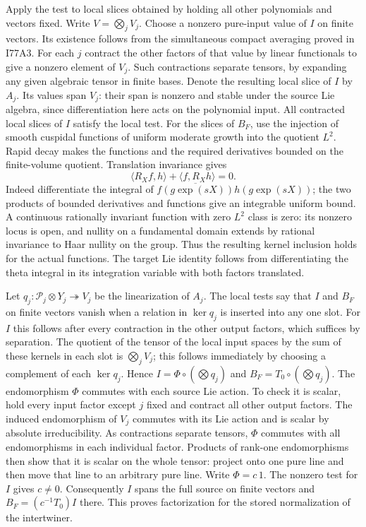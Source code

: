 Apply the test to local slices obtained by holding all other
polynomials and vectors fixed. Write $V=\bigotimes_j V_j$.
Choose a nonzero pure-input value of $I$ on finite vectors. Its
existence follows from the simultaneous compact averaging proved
in I77A3. For each $j$ contract the other factors of that
value by linear functionals to give a nonzero element of $V_j$.
Such contractions separate tensors, by expanding any given algebraic
tensor in finite bases. Denote the resulting local slice of $I$
by $A_j$. Its values span $V_j$: their span is nonzero and stable
under the source Lie algebra, since differentiation here acts on
the polynomial input. All contracted local slices of $I$ satisfy
the local test. For the slices of $B_F$, use the injection of smooth
cuspidal functions of uniform moderate growth into the quotient
$L^2$. Rapid decay makes the functions and the required derivatives
bounded on the finite-volume quotient. Translation invariance gives
\[
  \langle R_X f,h\rangle+\langle f,R_X h\rangle=0.
\]
Indeed differentiate the integral of
$\overline{f(g\exp(sX))}h(g\exp(sX))$; the two products of
bounded derivatives and functions give an integrable uniform bound.
A continuous rationally invariant function with zero $L^2$ class is
zero: its nonzero locus is open, and nullity on a fundamental domain
extends by rational invariance to Haar nullity on the group.
Thus the resulting kernel inclusion holds for the actual functions.
The target Lie identity follows from differentiating the theta
integral in its integration variable with both factors translated.

Let $q_j:\mathcal P_j\otimes Y_j\twoheadrightarrow V_j$ be the
linearization of $A_j$. The local tests say that $I$ and $B_F$ on
finite vectors vanish when a relation in $\ker q_j$ is inserted into
any one slot. For $I$ this follows after every contraction in the
other output factors, which suffices by separation. The quotient of
the tensor of the local input spaces by the sum of these kernels
in each slot is $\bigotimes_j V_j$; this follows immediately by
choosing a complement of each $\ker q_j$. Hence
$I=\Phi\circ(\bigotimes q_j)$ and $B_F=T_0\circ(\bigotimes q_j)$.
The endomorphism $\Phi$ commutes with each source Lie action.
To check it is scalar, hold every input factor except $j$ fixed
and contract all other output factors. The induced endomorphism
of $V_j$ commutes with its Lie action and is scalar by absolute
irreducibility. As contractions separate tensors, $\Phi$ commutes
with all endomorphisms in each individual factor. Products of
rank-one endomorphisms then show that it is scalar on the whole
tensor: project onto one pure line and then move that line to an
arbitrary pure line. Write $\Phi=c\,1$. The nonzero test for $I$
gives $c\ne0$. Consequently $I$ spans the full source on finite
vectors and $B_F=(c^{-1}T_0)I$ there. This proves factorization for
the stored normalization of the intertwiner.

